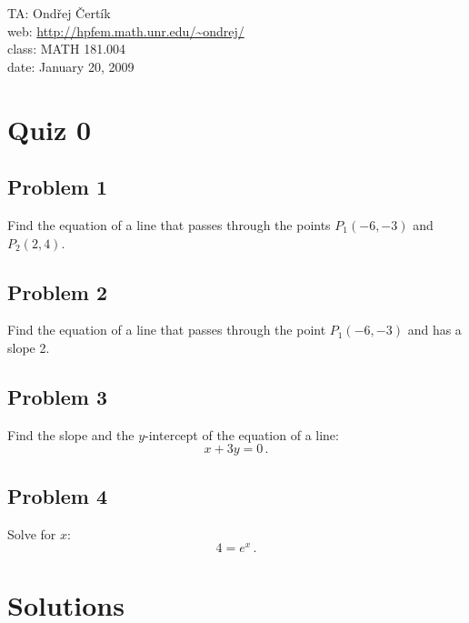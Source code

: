 \documentclass[11pt]{article}
\begin{document}
\noindent TA: Ondřej Čertík\\
web: \url{http://hpfem.math.unr.edu/~ondrej/}\\
class: MATH 181.004\\
date: January 20, 2009

\section*{Quiz 0}

\subsection*{Problem 1}

Find the equation of a line that passes through the points $P_1(-6, -3)$ and
$P_2(2, 4)$.

\subsection*{Problem 2}

Find the equation of a line that passes through the point $P_1(-6, -3)$ and has
a slope 2.

\subsection*{Problem 3}

Find the slope and the $y$-intercept of the equation of a line:
$$x+3y=0\,.$$

\subsection*{Problem 4}

Solve for $x$:
$$4=e^x\,.$$

\section*{Solutions}
\end{document}
